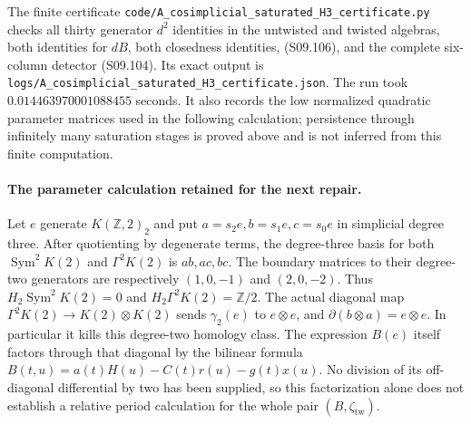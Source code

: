 The finite certificate
\texttt{code/A\_cosimplicial\_saturated\_H3\_certificate.py}
checks all thirty generator $d^2$ identities in the
untwisted and twisted algebras, both identities for
$dB$, both closedness identities, (S09.106), and the
complete six-column detector (S09.104).  Its exact
output is
\texttt{logs/A\_cosimplicial\_saturated\_H3\_certificate.json}.
The run took $0.014463970001088455$ seconds.
It also records the low normalized quadratic parameter
matrices used in the following calculation; persistence
through infinitely many saturation stages is proved
above and is not inferred from this finite computation.

\paragraph{The parameter calculation retained for the next repair.}
Let $e$ generate $K(\mathbb Z,2)_2$ and put
$a=s_2e,b=s_1e,c=s_0e$ in simplicial degree three.
After quotienting by degenerate terms, the degree-three
basis for both $\operatorname{Sym}^2 K(2)$ and
$\Gamma^2 K(2)$ is $ab,ac,bc$.  The boundary matrices
to their degree-two generators are respectively
$(1,0,-1)$ and $(2,0,-2)$.  Thus
$H_2\operatorname{Sym}^2 K(2)=0$ and
$H_2\Gamma^2 K(2)=\mathbb Z/2$.
The actual diagonal map
$\Gamma^2 K(2)\to K(2)\otimes K(2)$ sends
$\gamma_2(e)$ to $e\otimes e$, and
$\partial(b\otimes a)=e\otimes e$.
In particular it kills this degree-two homology class.
The expression $B(e)$ itself factors through that
diagonal by the bilinear formula
$B(t,u)=a(t)H(u)-C(t)r(u)-g(t)x(u)$.
No division of its off-diagonal differential by two
has been supplied, so this factorization alone does
not establish a relative period calculation for the
whole pair $(B,\zeta_{\mathrm{tw}})$.
